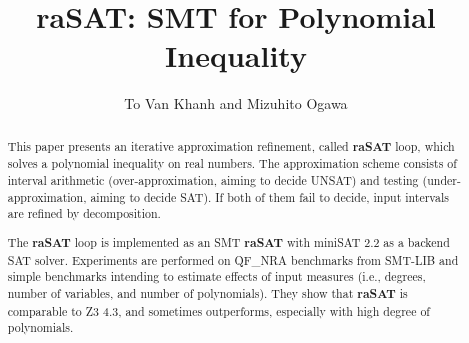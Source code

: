 \documentclass[runningheads,a4paper,oribibl]{llncs}
\newcommand{\suppress}[1]{} %
\begin{document}
%
\title{{\bf raSAT}: SMT for Polynomial Inequality}

\author{To Van Khanh and Mizuhito Ogawa} 

\maketitle

\begin{abstract}
This paper presents an iterative approximation refinement, called {\bf raSAT} loop, 
which solves a polynomial inequality on real numbers.
The approximation scheme consists of interval arithmetic 
(over-approximation, aiming to decide UNSAT) and 
testing (under-approximation, aiming to decide SAT). 
If both of them fail to decide, input intervals are refined by decomposition. 

The {\bf raSAT} loop is implemented as an SMT {\bf raSAT} with miniSAT 2.2 as 
a backend SAT solver. 
Experiments are performed on QF\_NRA benchmarks from SMT-LIB and 
simple benchmarks intending to estimate effects of input measures 
(i.e., degrees, number of variables, and number of polynomials). 
They show that {\bf raSAT} is comparable to Z3 4.3, and sometimes outperforms, 
especially with high degree of polynomials.

\suppress{
Experiments are performed on simple benchmarks to estimate effects of input measures, 
(the degree of polynomials, the number of variables, 
and the number of atomic polynomial inequalities), and benchmarks of QF\_NRA category 
in SMT-LIB. Results show that {\bf raSAT} is comparable and sometimes outperform 
Z3 4.3, which is believed to be one of the strongest SMT solvers on QF\_NRA category.  
}
\end{abstract}

\end{document}
